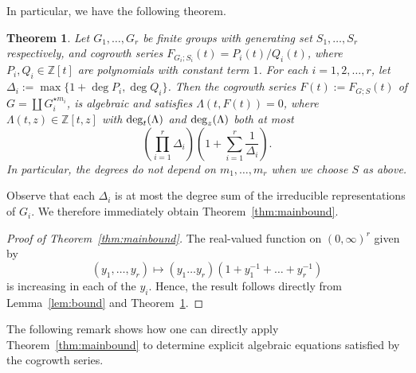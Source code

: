 \documentclass[11pt]{amsart}
\newtheorem{theorem}{Theorem}[section]
\newtheorem{corollary}[theorem]{Corollary}
\theoremstyle{definition}
\newtheorem{example}[theorem]{Example}
\newcommand{\Z}{\mathbb{Z}}
\newcommand{\inv}[1]{#1^{-1}}
\DeclareMathOperator{\Sym}{Sym}
\begin{document}
 In particular, we have the following theorem.
 \begin{theorem}
   \label{thm:generalbound}
   Let $G_1,\ldots ,G_r$ be finite groups with generating set $S_1,\hdots, S_r$ respectively, and cogrowth series $F_{G_i;S_i}(t)=P_i(t)/Q_i(t)$, where $P_i,Q_i\in \Z[t]$ are polynomials with constant term $1$. For each $i=1,2,\hdots, r$, let
   $\Delta_i:=\max\{1+\deg P_i, \deg Q_i\}$.
 Then the cogrowth series $F(t):=F_{G;S}(t)$ of $G=\coprod G_i^{\star m_i}$, is algebraic and satisfies $\Lambda(t,F(t))=0$, where $\Lambda(t,z)\in \Z[t,z]$ with 
 ${\rm deg}_t(\Lambda)$ and ${\rm deg}_z(\Lambda)$ both at most
 $$\left(\prod_{i=1}^r \Delta_i\right) \left( 1 + \sum_{i=1}^r \frac{1}{\Delta_i} \right).$$
 In particular, the degrees do not depend on $m_1,\ldots ,m_r$ when we choose
 $S$ as above.
 \end{theorem}

Observe that each $\Delta_i$ is at most the degree sum of the irreducible representations of $G_i$. We therefore immediately obtain Theorem~\ref{thm:mainbound}.

%
\begin{proof}[Proof of Theorem~\ref{thm:mainbound}]
The real-valued function on $(0,\infty)^r$ given by 
$$(y_1,\hdots,y_r)\mapsto (y_1\hdots y_r) (1+\inv{y_1}+\hdots+\inv{y_r})$$ 
is increasing in each of the $y_i$. Hence, the result follows directly from Lemma~\ref{lem:bound} and Theorem~\ref{thm:generalbound}.
\end{proof}

The following remark shows how one can directly apply Theorem~\ref{thm:mainbound} to determine
explicit algebraic equations satisfied by the cogrowth series.
 

  
\end{document}
